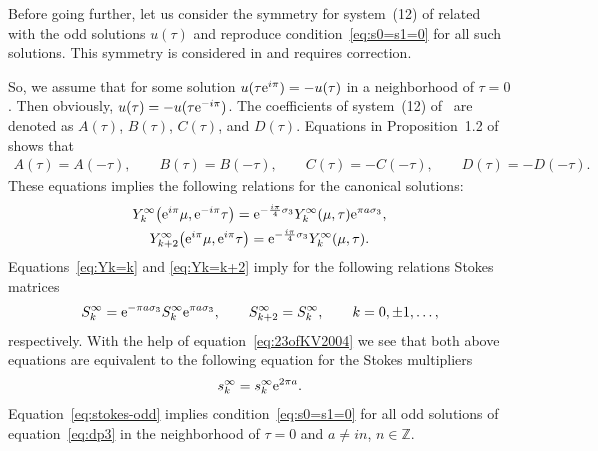 \documentclass[pdftex]{sigma}
\numberwithin{equation}{section}
\begin{document}
Before going further, let us consider the symmetry for system~(12) of \cite{KV2004}
related with the odd solutions $u(\tau)$ and reproduce condition~\eqref{eq:s0=s1=0} for all such solutions.
This symmetry is considered in \cite[Section~6.2, item~6.2.1, p.~1199]{KV2004} and requires correction.

So, we assume that for some solution $u(\tau {\rm e}^{i\pi})=-u(\tau)$ in a neighborhood of $\tau=0$. Then obviously,
$u(\tau)=-u(\tau {\rm e}^{-i\pi})$. The coefficients of system~(12) of~\cite{KV2004} are denoted as $A(\tau)$, $B(\tau)$,
$C(\tau)$, and $D(\tau)$. Equations in Proposition~1.2 of~\cite{KV2004} shows that
\begin{gather*}
A(\tau)=A(-\tau),\qquad
B(\tau)=B(-\tau),\qquad
C(\tau)=-C(-\tau),\qquad
D(\tau)=-D(-\tau).
\end{gather*}
These equations implies the following relations for the canonical solutions:
\begin{gather}
Y_k^\infty\big({\rm e}^{i\pi}\mu,{\rm e}^{-i\pi}\tau\big)={\rm e}^{-\frac{i\pi}4\sigma_3}Y_k^\infty(\mu,\tau){\rm e}^{\pi a\sigma_3},\label{eq:Yk=k}\\
Y_{k+2}^\infty\big({\rm e}^{i\pi}\mu,{\rm e}^{i\pi}\tau\big)={\rm e}^{-\frac{i\pi}4\sigma_3}Y_k^\infty(\mu,\tau).\label{eq:Yk=k+2}
\end{gather}
Equations~\eqref{eq:Yk=k} and \eqref{eq:Yk=k+2} imply for the following relations Stokes matrices
\begin{align*}
S_k^\infty={\rm e}^{-\pi a\sigma_3}S_k^\infty {\rm e}^{\pi a\sigma_3},\qquad
S_{k+2}^\infty=S_k^\infty,\qquad
k=0,\pm1,\ldots,
\end{align*}
respectively. With the help of equation~\eqref{eq:23ofKV2004} we see that both above equations are equivalent
to the following equation for the Stokes multipliers
\begin{gather}\label{eq:stokes-odd}
s_k^\infty=s_k^\infty {\rm e}^{2\pi a}.
\end{gather}
Equation~\eqref{eq:stokes-odd} implies condition~\eqref{eq:s0=s1=0} for all odd solutions of equation~\eqref{eq:dp3}
in the neighborhood of $\tau=0$ and $a\neq in$, $n\in\mathbb Z$.
\end{document}
